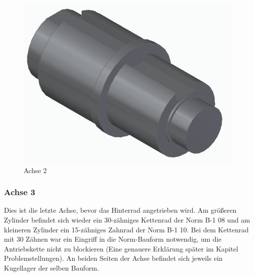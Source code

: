 \begin{figure} [H]
	\begin{center}
		\includegraphics[scale=0.5]{figures/mechanik/Achse_mit_nuten_20mm.jpg}
			\caption{Achse 2}
			\label{fig:Achse 2}
	\end{center}
\end{figure}

\subsubsection*{Achse 3}

Dies ist die letzte Achse, bevor das Hinterrad angetrieben wird. Am größeren Zylinder befindet sich wieder ein 30-zähniges Kettenrad der Norm B-1 08 und am kleineren Zylinder ein 15-zähniges Zahnrad der Norm B-1 10. Bei dem Kettenrad mit 30 Zähnen war ein Eingriff in die Norm-Bauform notwendig, um die Antriebskette nicht zu blockieren (Eine genauere Erklärung später im Kapitel Problemstellungen). An beiden Seiten der Achse befindet sich jeweils ein Kugellager der selben Bauform. 


